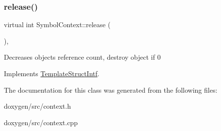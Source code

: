 \subsubsection{\texorpdfstring{release()}{release()}}
{\footnotesize\ttfamily virtual int Symbol\+Context\+::release (\begin{DoxyParamCaption}{ }\end{DoxyParamCaption})\hspace{0.3cm}{\ttfamily [inline]}, {\ttfamily [virtual]}}

Decreases object\textquotesingle{}s reference count, destroy object if 0 

Implements \mbox{\hyperlink{class_template_struct_intf_a3dce7dd29d3f66a8080b40578e8a5045}{Template\+Struct\+Intf}}.



The documentation for this class was generated from the following files\+:\begin{DoxyCompactItemize}
\item 
doxygen/src/context.\+h\item 
doxygen/src/context.\+cpp\end{DoxyCompactItemize}
